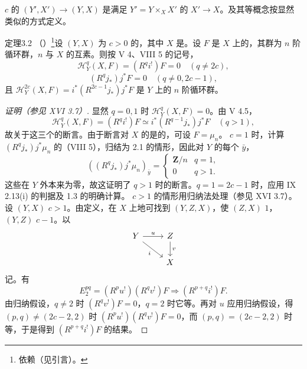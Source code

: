  $c$ 的 $(Y',X')\to(Y,X)$ 是满足 $Y'=Y\times_XX'$ 的 $X'\to X$。及其等概念按显然类似的方式定义。
\begin{SGAresult}{定理}{3.2}
（）\footnote{依赖（见引言）。}设 $(Y,X)$ 为 $c>0$ 的，其中 $X$ 是。设 $F$ 是 $X$ 上的，其群为 $n$ 阶循环群，$n$ 与 $X$ 的互素。则按 V 4、VIII 5 的记号，
\[\mathcal H_Y^q(X,F)=(R^qi^!)F=0\quad(q\ne2c),\]
\[(R^qj_*)j^*F=0\quad(q\ne0,2c-1),\]
且 $\mathcal H_Y^{2c}(X,F)=i^*(R^{2c-1}j_*)j^*F$ 是 $Y$ 上的 $n$ 阶循环群。
\end{SGAresult}
\begin{proof}[证明（参见 XVI 3.7）]
显然 $q=0,1$ 时 $\mathcal H_Y^q(X,F)=0$。由 V 4.5，
\[\mathcal H_Y^q(X,F)=(R^qi^!)F\simeq i^*(R^{q-1}j_*)j^*F\quad(q>1),\]
故关于这三个的断言。由于断言对 $X$ 的是的，可设 $F=\mu_n$。
$c=1$ 时，计算 $(R^qj_*)j^*\mu_n$ 的（VIII 5），归结为 2.1 的情形，因此对 $Y$ 的每个 $\bar y$，
\[((R^qj_*)j^*\mu_n)_{\bar y}=\begin{cases}\mathbf Z/n&q=1,\\0&q>1.\end{cases}\]
这些在 $Y$ 外本来为零，故这证明了 $q>1$ 时的断言。$q=1=2c-1$ 时，应用 IX 2.13(i) 的判据及 1.3 的明确计算。
$c>1$ 的情形用归纳法处理（参见 XVI 3.7）。设 $(Y,X)$  $c>1$。由定义，在 $X$ 上地可找到 $(Y,Z,X)$，使 $(Z,X)$  $1$，$(Y,Z)$  $c-1$。以
\[\begin{tikzcd}Y\arrow[r,"u"]\arrow[dr,"i"']&Z\arrow[d,"v"]\\&X\end{tikzcd}\]
记。有
\[E_2^{pq}=(R^pu^!)(R^qv^!)F\Longrightarrow(R^{p+q}i^!)F.\]
由归纳假设，$q\ne2$ 时 $(R^qv^!)F=0$，$q=2$ 时它等。再对 $u$ 应用归纳假设，得 $(p,q)\ne(2c-2,2)$ 时 $(R^pu^!)(R^qv^!)F=0$，而 $(p,q)=(2c-2,2)$ 时等，于是得到 $(R^{p+q}i^!)F$ 的结果。
\end{proof}
